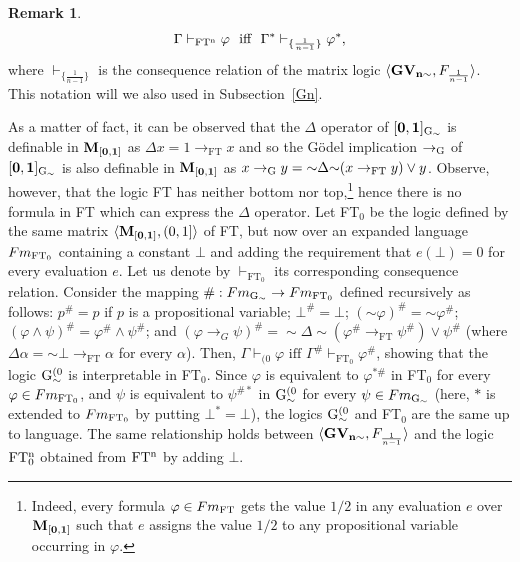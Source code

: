 \documentclass{article}
\theoremstyle{definition}
\newtheorem{remark}{Remark}
\newcommand{\ninv}{\mathord{\sim}}
\begin{document}
\begin{remark}
$$\Gamma \vdash_{\rm{FT^n}} \varphi \ \mbox{ iff } \ \Gamma^* \vdash_{\{\frac{1}{n-1}\}} \varphi^*,$$ 
where $\vdash_{\{\frac{1}{n-1}\}}$ is the consequence relation of the matrix logic  $\langle {\bf GV_{n\sim}},F_{\frac{1}{n-1}}\rangle$. This notation will we also used in Subsection~\ref{Gn}. 

As a matter of fact, it can be observed that the $\Delta$ operator of  $\bf [0,1]_{\rm{G}_\sim}$ is definable in $\bf M_{[0,1]}$ as $\Delta x = 1 \to_\mathrm{FT} x$ and so the G\"odel implication $\to_{\rm{G}}$ of  $\bf [0,1]_{\rm{G}_\sim}$  is also definable in $\bf M_{[0,1]}$ as   $x \to_{\rm{G}} y = {\sim} \Delta {\sim}(x \to_\mathrm{FT} y) \lor y$. Observe, however, that the logic FT has neither bottom nor top,\footnote{Indeed, every formula $\varphi \in  Fm_{\rm FT}$ gets the value $1/2$ in any evaluation $e$ over $\bf M_{[0,1]}$ such that $e$ assigns the value $1/2$ to any propositional variable occurring in $\varphi$.} hence there is no formula in FT which can express the $\Delta$ operator. Let FT$_0$ be the logic defined by the same matrix $\langle {\bf M_{[0,1]}},(0,1]\rangle$ of FT, but now over an expanded language $Fm_{\rm FT_0}$ containing a constant $\bot$ and adding the requirement that $e(\bot) = 0$ for every evaluation $e$. Let us denote by $\vdash_{\mathrm{FT}_0}$   its corresponding consequence relation. Consider the mapping $\#: Fm_{\rm{G}_\sim} \to Fm_{\rm FT_0}$ defined recursively as follows: $p^{\#}=p$ if $p$ is a propositional variable; $\bot^{\#}=\bot$;  $(\ninv \varphi)^{\#} = \ninv\varphi^{\#}$; $(\varphi\land \psi)^{\#} = \varphi^{\#} \land \psi^{\#}$;  and  $(\varphi \to_G \psi)^{\#} = {\sim} \Delta {\sim}(\varphi^{\#} \to_\mathrm{FT} \psi^{\#}) \lor \psi^\#$ (where $\Delta \alpha = \ninv \bot \to_\mathrm{FT} \alpha$ for every $\alpha$). Then, $\Gamma \vdash_{(0} \varphi  \mbox{ iff } \Gamma^\# \vdash_{\mathrm{FT}_0} \varphi^\#$, showing that  the logic  ${\rm G}^{(0}_\sim$ is interpretable in FT$_0$. 
Since $\varphi$ is equivalent to $\varphi^{*\#}$ in FT$_0$ for every $\varphi \in Fm_{\rm FT_0}$,  and $\psi$ is equivalent to $\psi^{\#*}$ in ${\rm G}^{(0}_\sim$ for every $\psi \in Fm_{\rm{G}_\sim}$ (here, $*$ is extended to $Fm_{\rm FT_0}$ by putting $\bot^*=\bot$), the logics  ${\rm G}^{(0}_\sim$ and FT$_0$ are the same up to language. 
The same relationship holds between  $\langle {\bf GV_{n\sim}},F_{\frac{1}{n-1}}\rangle$ and the logic $\rm FT_0^n$ obtained from  $\rm FT^n$ by adding $\bot$.

\end{remark}
\end{document}
